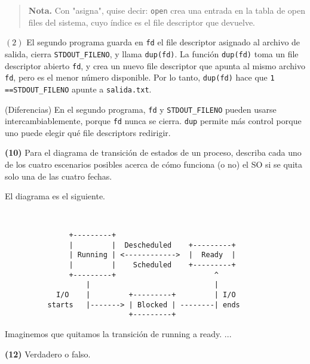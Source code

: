 \documentclass[12pt]{article}
\theoremstyle{definition}
\begin{document}
\small
\begin{quote}

    \textbf{Nota.} Con "asigna", quise decir: \texttt{open} crea una entrada en
    la tabla de open files del sistema, cuyo índice es el file descriptor que
    devuelve.
\end{quote}
\normalsize

$(2)$ El segundo programa guarda en \texttt{fd} el file descriptor asignado al
archivo de salida, cierra \texttt{STDOUT\_FILENO}, y llama \texttt{dup(fd)}. 
La función \texttt{dup(fd)} toma un file descriptor abierto \texttt{fd}, y crea
un nuevo file descriptor que apunta al mismo archivo \texttt{fd}, pero es el
menor número disponible. Por lo tanto, \texttt{dup(fd)} hace que 
\texttt{1 ==STDOUT\_FILENO} apunte a \texttt{salida.txt}.

(Diferencias) En el segundo programa, \texttt{fd} y \texttt{STDOUT\_FILENO}
pueden usarse intercambiablemente, porque \texttt{fd} nunca se cierra.
\texttt{dup} permite más control porque uno puede elegir qué file descriptors
redirigir. 



\pagebreak 

\begin{shaded}
    \textbf{(10)} Para el diagrama de transición de estados de un proceso,
    describa cada uno de los cuatro escenarios posibles acerca de cómo funciona
    (o no) el SO si se quita solo una de las cuatro fechas.
\end{shaded}

El diagrama es el siguiente.

\begin{verbatim}
               

               +---------+   
               |         |  Descheduled    +---------+
               | Running | <------------>  |  Ready  |
               |         |    Scheduled    +---------+
               +---------+                       ^
                   |                             |
            I/O    |         +---------+         | I/O
          starts   |-------> | Blocked | --------| ends
                             +---------+
\end{verbatim}

Imaginemos que quitamos la transición de running a ready. ...


\pagebreak

\begin{shaded}
    \textbf{(12)} Verdadero o falso.
\end{shaded}
\end{document}
